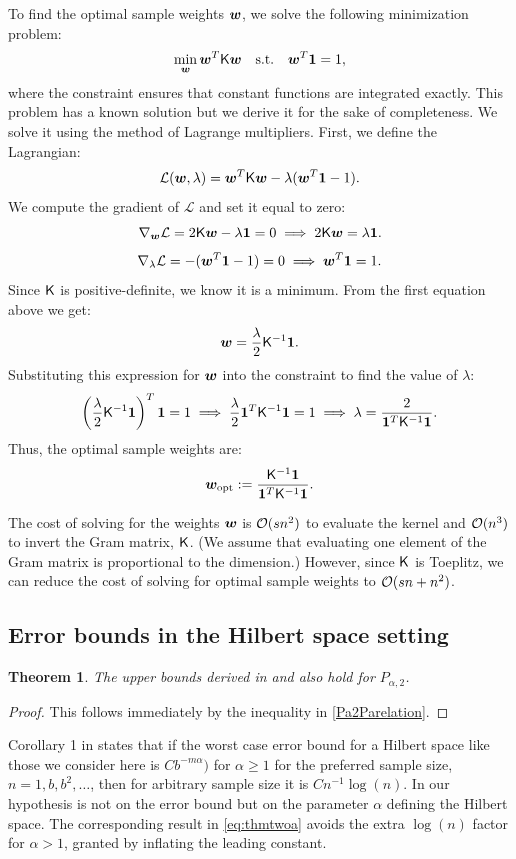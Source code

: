 \documentclass[authoryear]{elsarticle}
\newtheorem{theorem}{Theorem}
\begin{document}
To find the optimal sample weights $\boldsymbol{w}$, we solve the following minimization problem:
\[ \min_{\boldsymbol{w}} \boldsymbol{w}^T \mathsf{K} \boldsymbol{w} \quad \text{s.t.} \quad \boldsymbol{w}^T \boldsymbol{1} = 1, \]
where the constraint ensures that constant functions are integrated exactly. This problem has a known solution but we derive it for the sake of completeness. We solve it using the method of Lagrange multipliers. 
First, we define the Lagrangian:  
\[
\mathcal{L}(\boldsymbol{w}, \lambda) = \boldsymbol{w}^T \mathsf{K} \boldsymbol{w} - \lambda (\boldsymbol{w}^T \boldsymbol{1} - 1).
\]
We compute the gradient of \(\mathcal{L}\) and set it equal to zero:
\[
\nabla_{\boldsymbol{w}} \mathcal{L} = 2 \mathsf{K} \boldsymbol{w} - \lambda \boldsymbol{1} = 0 \implies 2\mathsf{K} \boldsymbol{w} = \lambda \boldsymbol{1}.
\]
\[
\nabla_{\lambda} \mathcal{L} = -(\boldsymbol{w}^T \boldsymbol{1} - 1) = 0 \implies \boldsymbol{w}^T \boldsymbol{1} = 1.
\]
Since $\mathsf{K}$ is positive-definite, we know it is a minimum. 
From the first equation above we get:
\[
\boldsymbol{w} = \frac{\lambda}{2} \mathsf{K}^{-1} \boldsymbol{1}.
\]
Substituting this expression for $\boldsymbol{w}$ into the constraint to find the value of $\lambda$:
\[
\left(\frac{\lambda}{2} \mathsf{K}^{-1} \boldsymbol{1} \right)^T \boldsymbol{1} = 1
\implies \frac{\lambda}{2} \boldsymbol{1}^T \mathsf{K}^{-1} \textbf{1} = 1
 \implies \lambda = \frac{2}{\boldsymbol{1}^T \mathsf{K}^{-1} \boldsymbol{1}}.
 \]
Thus, the optimal sample weights are: 
\[
\boldsymbol{w}_{\operatorname{opt}} := \frac{\mathsf{K}^{-1}\boldsymbol{1}}{\boldsymbol{1}^T \mathsf{K}^{-1}\boldsymbol{1} }.
\]

The cost of solving for the weights $\boldsymbol{w}$ is $\operatorname{{\mathcal O}}(sn^2)$ to evaluate the kernel and $\operatorname{{\mathcal O}}(n^3)$ to invert the Gram matrix, $\mathsf{K}$.  (We assume that evaluating one element of the Gram matrix is proportional to the dimension.)  However, since $\mathsf{K}$ is Toeplitz, we can reduce the cost of solving for optimal sample weights to $\operatorname{{\mathcal O}}(sn+n^2)$.   %

\subsection{Error bounds in the Hilbert space setting}

\begin{theorem} \label{thm:three}
The upper bounds derived in  and  also hold for $P_{\alpha,2}$.
\end{theorem}

\begin{proof}
    This follows immediately by the inequality in \eqref{Pa2Parelation}.
\end{proof}

Corollary 1 in \cite{HicEtal10a} states that if the worst case error bound for a Hilbert space like those we consider here is $Cb^{-m \alpha})$ for $\alpha \ge 1$ for the preferred sample size, $n = 1, b, b^2, \ldots$, then for arbitrary sample size it is $C n^{-1} \log(n)$. In   our hypothesis is not on the error bound but on the parameter $\alpha$ defining the Hilbert space.  The corresponding result in \eqref{eq:thmtwoa} avoids the extra $\log(n)$ factor for $\alpha > 1$, granted by inflating the leading constant.
\end{document}
